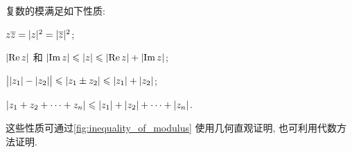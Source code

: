 复数的模满足如下性质:
\begin{enuma}
  \item $z\overline z=\lvert z\rvert^2=\lvert\overline z\rvert^2$;
  \label{enum:modulus-zzbar}
  \item $\lvert\operatorname{Re} z\rvert$ 和 $\lvert\operatorname{Im} z\rvert\leqslant \lvert z\rvert\leqslant\lvert\operatorname{Re} z\rvert+\lvert\operatorname{Im} z\rvert$;
  \label{enum:re-im-less}
  \item $\bigl\vert\lvert z_1\rvert-\lvert z_2\rvert\bigr\vert\leqslant\lvert z_1\pm z_2\rvert\leqslant\lvert z_1\rvert+\lvert z_2\rvert$;
  \label{enum:modulus-triangle-inequality}
  \item $\lvert z_1+z_2+\cdots+z_n\rvert\leqslant\lvert z_1\rvert+\lvert z_2\rvert+\cdots+\lvert z_n\rvert$.
  \label{enum:modulus-nangle-inequality}
\end{enuma}

这些性质可通过\ref{fig:inequality_of_modulus} 使用几何直观证明, 也可利用代数方法证明.

